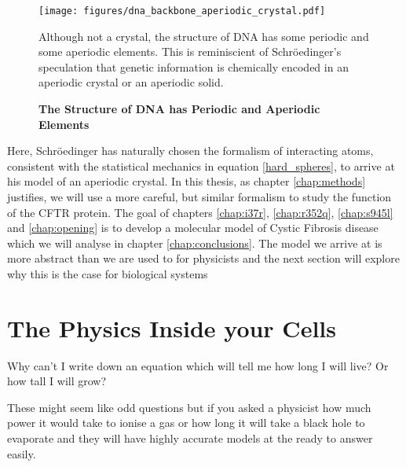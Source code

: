 \begin{figure}
	\begin{center}
		\texttt{[image: figures/dna\_backbone\_aperiodic\_crystal.pdf]}
	\end{center}
	\captionsetup{singlelinecheck = false, justification=raggedright}
	\caption[The Structure of DNA has Periodic and Aperiodic Elements] {\textbf{The Structure of DNA has Periodic and Aperiodic Elements}}{Although not a crystal, the structure of DNA has some periodic and some aperiodic elements. This is reminiscient of Schr\"oedinger's speculation that genetic information is chemically encoded in an aperiodic crystal or an aperiodic solid. }
	\label{dna_structure}
\end{figure}

Here, Schr\"oedinger has naturally chosen the formalism of interacting atoms, consistent with the statistical mechanics in equation \ref{hard_spheres}, to arrive at his model of an aperiodic crystal. In this thesis, as chapter \ref{chap:methods} justifies, we will use a more careful, but similar formalism to study the function of the CFTR protein. The goal of chapters \ref{chap:i37r}, \ref{chap:r352q}, \ref{chap:s945l} and \ref{chap:opening} is to develop a molecular model of Cystic Fibrosis disease which we will analyse in chapter \ref{chap:conclusions}. The model we arrive at is more abstract than we are used to for physicists and the next section will explore why this is the case for biological systems
 


\section{The Physics Inside your Cells}

Why can't I  write down an equation which will tell me how long I will live? Or how tall I will grow?

These might seem like odd questions but if you asked a physicist how much power it would take to ionise a gas or how long it will take a black hole to evaporate and they will have highly accurate models at the ready to answer easily. 


